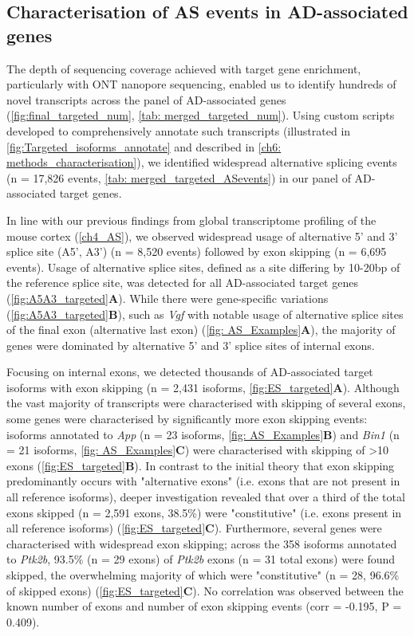 \clearpage

\subsection{Characterisation of AS events in AD-associated genes}
The depth of sequencing coverage achieved with target gene enrichment, particularly with ONT nanopore sequencing, enabled us to identify hundreds of novel transcripts across the panel of AD-associated genes (\cref{fig:final_targeted_num}, \cref{tab: merged_targeted_num}). Using custom scripts developed to comprehensively annotate such transcripts (illustrated in \cref{fig:Targeted_isoforms_annotate} and described in \cref{ch6: methods_characterisation}), we identified widespread alternative splicing events (n = 17,826 events, \cref{tab: merged_targeted_ASevents}) in our panel of AD-associated target genes.

In line with our previous findings from global transcriptome profiling of the mouse cortex (\cref{ch4_AS}), we observed widespread usage of alternative 5' and 3' splice site (A5', A3') (n = 8,520 events) followed by exon skipping (n = 6,695 events). Usage of alternative splice sites, defined as a site differing by 10-20bp of the reference splice site, was detected for all AD-associated target genes (\cref{fig:A5A3_targeted}\textbf{A}). While there were gene-specific variations (\cref{fig:A5A3_targeted}\textbf{B}), such as \textit{Vgf} with notable usage of alternative splice sites of the final exon (alternative last exon) (\cref{fig: AS_Examples}\textbf{A}), the majority of genes were dominated by alternative 5' and 3' splice sites of internal exons.

Focusing on internal exons, we detected thousands of AD-associated target isoforms with exon skipping (n = 2,431 isoforms, \cref{fig:ES_targeted}\textbf{A}). Although the vast majority of transcripts were characterised with skipping of several exons, some genes were characterised by significantly more exon skipping events: isoforms annotated to \textit{App} (n = 23 isoforms, \cref{fig: AS_Examples}\textbf{B}) and \textit{Bin1} (n = 21 isoforms, \cref{fig: AS_Examples}\textbf{C}) were characterised with skipping of >10 exons (\cref{fig:ES_targeted}\textbf{B}). In contrast to the initial theory that exon skipping predominantly occurs with "alternative exons" (i.e. exons that are not present in all reference isoforms), deeper investigation revealed that over a third of the total exons skipped (n = 2,591 exons, 38.5\%) were "constitutive" (i.e. exons present in all reference isoforms) (\cref{fig:ES_targeted}\textbf{C}). Furthermore, several genes were characterised with widespread exon skipping; across the 358 isoforms annotated to \textit{Ptk2b}, 93.5\% (n = 29 exons)  of \textit{Ptk2b} exons (n = 31 total exons) were found skipped, the overwhelming majority of which were "constitutive" (n = 28, 96.6\% of skipped exons) (\cref{fig:ES_targeted}\textbf{C}). No correlation was observed between the known number of exons and number of exon skipping events (corr = -0.195, P = 0.409). 

